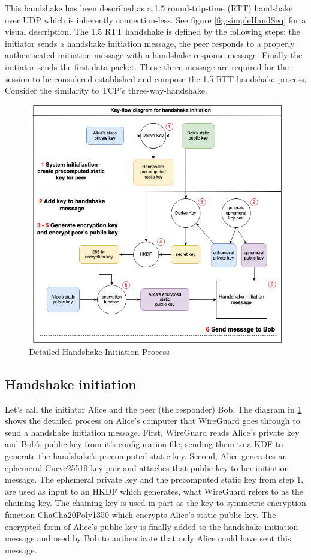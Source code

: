 \documentclass [11pt, proquest] {uwthesis}[2020/02/24]
\begin{document}
This handshake has been described as a 1.5 round-trip-time (RTT) handshake over UDP which is inherently connection-less. See figure \ref{fig:simpleHandSeq} for a visual description.  The 1.5 RTT handshake is defined by the following steps: the initiator sends a handshake initiation message, the peer responds to a properly authenticated initiation message with a handshake response message. Finally the initiator sends the first data packet. These three message are required for the session to be considered established and compose the 1.5 RTT handshake process. Consider the similarity to TCP's three-way-handshake.
\begin{figure}[H]
\includegraphics[width=16cm]{paper/images/key-flow-wg.png}
\caption{Detailed Handshake Initiation Process}
\label{fig:keyflow}
\end{figure}
\subsection{Handshake initiation}
\label{handinit}
Let's call the initiator Alice and the peer (the responder) Bob.
The diagram in \ref{fig:keyflow} shows the detailed process on Alice's computer that WireGuard goes through to send a handshake initiation message. First, WireGuard reads Alice's private key and Bob's public key from it's configuration file, sending them to a KDF to generate the handshake's precomputed-static key. Second, Alice generates an ephemeral Curve25519 key-pair and attaches that public key to her initiation message. The ephemeral private key and the precomputed static key from step 1, are used as input to an HKDF which generates, what WireGuard refers to as the chaining key. The chaining key is used in part as the key to symmetric-encryption function ChaCha20Poly1350 which encrypts Alice's static public key. The encrypted form of Alice's public key is finally added to the handshake initiation message and used by Bob to authenticate that only Alice could have sent this message.
\end{document}
